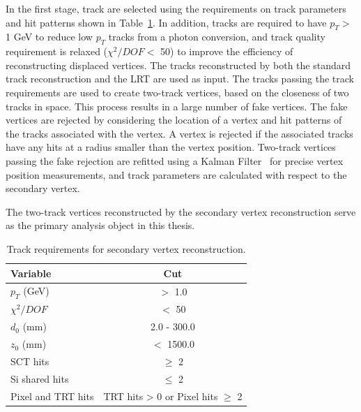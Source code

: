 In the first stage, track are selected using the requirements on track parameters and hit patterns shown in Table~\ref{table:vertex_track_selection_simple}. In addition, tracks are required to have $p_{T} >$ 1 GeV to reduce low $p_{T}$ tracks from a photon conversion, and track quality requirement is relaxed ($\chi^{2} / DOF < $ 50) to improve the efficiency of reconstructing displaced vertices. The tracks reconstructed by both the standard track reconstruction and the LRT are used as input. The tracks passing the track requirements are used to create two-track vertices, based on the closeness of two tracks in space. This process results in a large number of fake vertices. The fake vertices are rejected by considering the location of a vertex and hit patterns of the tracks associated with the vertex. A vertex is rejected if the associated tracks have any hits at a radius smaller than the vertex position. Two-track vertices passing the fake rejection are refitted using a Kalman Filter~\cite{Kalman:434680} for precise vertex position measurements, and track parameters are calculated with respect to the secondary vertex.

The two-track vertices reconstructed by the secondary vertex reconstruction serve as the primary analysis object in this thesis. %







\begin{table}[!htb]
  \centering
  \begin{tabular}{ l c }
    \hline
    \hline
	Variable      		& Cut                                         	\\
    \hline
	$p_{T}$ (GeV)		& $>$ 1.0										\\
	$\chi^{2} / DOF$	& $<$ 50  										\\
	$d_{0}$	(mm)		& 2.0 - 300.0									\\
	$z_{0}$ (mm)		& $<$ 1500.0									\\
	SCT hits			& $\geq$ 2										\\
	Si shared hits	    & $\leq$ 2										\\
	Pixel and TRT hits  & TRT hits > 0 or Pixel hits $\geq$ 2			\\
    \hline
    \hline
  \end{tabular}
  \caption{Track requirements for secondary vertex reconstruction.}
  \label{table:vertex_track_selection_simple}
\end{table}


